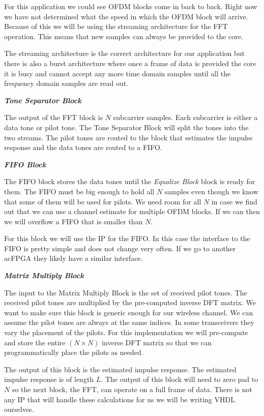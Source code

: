 For this application we could see \ac{OFDM} blocks come in back to back. Right now we have not determined what the speed in which the \ac{OFDM} block will arrive. Because of this we will be using the streaming architecture for the \ac{FFT} operation. This means that new samples can always be provided to the core.

The streaming architecture is the correct architecture for our application but there is also a burst architecture where once a frame of data is provided the core it is busy and cannot accept any more time domain samples until all the frequency domain samples are read out.

{\bf \emph{Tone Separator Block}}

The output of the \ac{FFT} block is $N$ subcarrier samples. Each subcarrier is either a data tone or pilot tone. The Tone Separator Block will split the tones into the two streams. The pilot tones are routed to the block that estimates the impulse response and the data tones are routed to a \ac{FIFO}.

{\bf \emph{\ac{FIFO} Block}}

The \ac{FIFO} block stores the data tones until the \emph{Equalize Block} block is ready for them. The \ac{FIFO} must be big enough to hold all $N$ samples even though we know that some of them will be used for pilots. We need room for all $N$ in case we find out that we can use a channel estimate for multiple \ac{OFDM} blocks. If we can then we will overflow a \ac{FIFO} that is smaller than $N$.

For this block we will use the \ac{IP} for the \ac{FIFO}. In this case the interface to the \ac{FIFO} is pretty simple and does not change very often. If we go to another ac{FPGA} they likely have a similar interface.

{\bf \emph{Matrix Multiply Block}}

The input to the Matrix Multiply Block is the set of received pilot tones. The received pilot tones are multiplied by the pre-computed inverse \ac{DFT} matrix. We want to make sure this block is generic enough for our wireless channel. We can assume the pilot tones are always at the same indices. In some transceivers they vary the placement of the pilots. For this implementation we will pre-compute and store the entire $(N\times N)$ inverse \ac{DFT} matrix so that we can programmatically place the pilots as needed.

The output of this block is the estimated impulse response. The estimated impulse response is of length $L$. The output of this block will need to zero pad to $N$ so the next block, the \ac{FFT}, can operate on a full frame of data. There is not any \ac{IP} that will handle these calculations for us we will be writing \ac{VHDL} ourselves.

